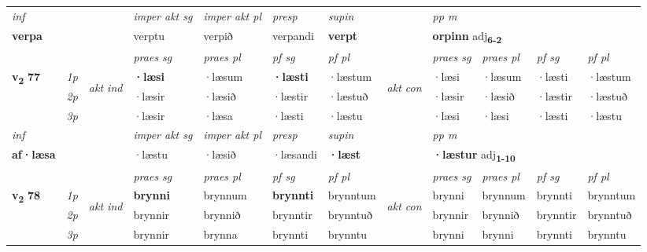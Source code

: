 \begin{longtable}[l]{X>{\footnotesize\itshape}llXXXXlXXXX}
   {\textit{inf}} & &  & \textit{imper akt sg} & \textit{imper akt pl}   & \textit{presp} & \textit{supin}  && \textit{pp m} \\*
  {\textbf{verpa}} & && verptu  & verpið   & verpandi &  \textbf{verpt}  && \multicolumn{2}{l}{\textbf{orpinn} adj\textbf{\textsubscript{6-2}}} \\*

\midrule

 & &   & \textit{praes sg}  & \textit{praes pl}    & \textit{ pf sg} & \textit{pf pl} & & \textit{praes sg}  & \textit{praes pl}    & \textit{pf sg} & \textit{pf pl }  \\ \cmidrule{4-7} \cmidrule{9-12}
 \multirow{2}{*}{{{\textbf{v{\textsubscript{2}}} \Large{\textbf{77}}}}}  & 1p & \multirow{3}{*}{\begin{turn}{90}\textit{akt ind}\end{turn}} & \textbf{·læsi} & ·læsum & \textbf{·læsti} & ·læstum & \multirow{3}{*}{\begin{turn}{90}\textit{akt con}\end{turn}} &·læsi & ·læsum & ·læsti & ·læstum\\*
 & 2p &  &  ·læsir  & ·læsið & ·læstir & ·læstuð & & ·læsir & ·læsið & ·læstir & ·læstuð \\*
 & 3p &  & ·læsir & ·læsa & ·læsti & ·læstu & & ·læsi & ·læsi& ·læsti & ·læstu \\*
\cmidrule{4-7} \cmidrule{9-12}

   {\textit{inf}} & &  & \textit{imper akt sg} & \textit{imper akt pl}   & \textit{presp} & \textit{supin}  && \textit{pp m} \\*
  {\textbf{af\allowbreak ·læsa}} & && ·læstu  & ·læsið   & ·læsandi &  \textbf{·læst}  && \multicolumn{2}{l}{\textbf{·læstur} adj\textbf{\textsubscript{1-10}}} \\*

\midrule

 & &   & \textit{praes sg}  & \textit{praes pl}    & \textit{ pf sg} & \textit{pf pl} & & \textit{praes sg}  & \textit{praes pl}    & \textit{pf sg} & \textit{pf pl }  \\ \cmidrule{4-7} \cmidrule{9-12}
 \multirow{2}{*}{{{\textbf{v{\textsubscript{2}}} \Large{\textbf{78}}}}}  & 1p & \multirow{3}{*}{\begin{turn}{90}\textit{akt ind}\end{turn}} & \textbf{brynni} & brynnum & \textbf{brynnti} & brynntum & \multirow{3}{*}{\begin{turn}{90}\textit{akt con}\end{turn}} &brynni & brynnum & brynnti & brynntum\\*
 & 2p &  &  brynnir  & brynnið & brynntir & brynntuð & & brynnir & brynnið & brynntir & brynntuð \\*
 & 3p &  & brynnir & brynna & brynnti & brynntu & & brynni & brynni& brynnti & brynntu \\*
\cmidrule{4-7} \cmidrule{9-12}


\end{longtable}
